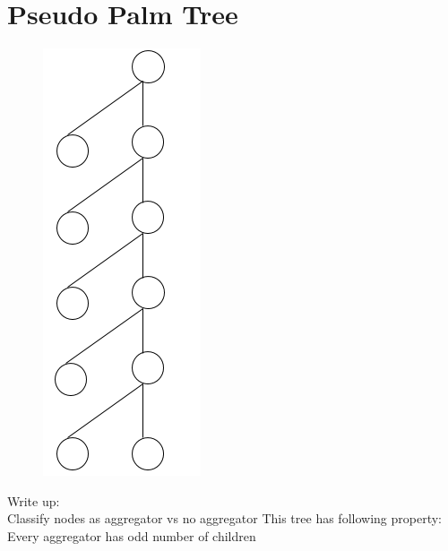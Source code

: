 \section{Pseudo Palm Tree}
	\begin{figure}[H]
		\centering
		\includegraphics{images/pseudo_palm_tree}
	\end{figure}
	
	Write up:\\
	Classify nodes as aggregator vs no aggregator
	This tree has following property: \\
		Every aggregator has odd number of children\\

